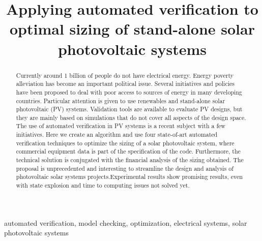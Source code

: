 \documentclass[10pt,conference]{IEEEtran}
\begin{document}
\title{Applying automated verification to optimal sizing of stand-alone solar photovoltaic systems\\
}

\author{
\and
{}
}

\maketitle

\begin{abstract}
Currently around 1 billion of people do not have electrical energy. Energy poverty alleviation has become an important political issue. Several initiatives and policies have been proposed to deal with poor access to sources of energy in many developing countries. Particular attention is given to use renewables and stand-alone solar photovoltaic (PV) systems. Validation tools are available to evaluate PV designs, but they are mainly based on simulations that do not cover all aspects of the design space. The use of automated verification in PV systems is a recent subject with a few initiatives. Here we create an algorithm and use four state-of-art automated verification techniques to optimize the sizing of a solar photovoltaic system, where commercial equipment data is part of the specification of the code. Furthermore, the technical solution is conjugated with the financial analysis of the sizing obtained. The proposal is unprecedented and interesting to streamline the design and analysis of photovoltaic solar systems projects.Experimental results show promising results, even with state explosion and time to computing issues not solved yet.
\end{abstract}

\begin{IEEEkeywords}
automated verification, model checking, optimization, electrical systems, solar photovoltaic systems
\end{IEEEkeywords}
\end{document}
